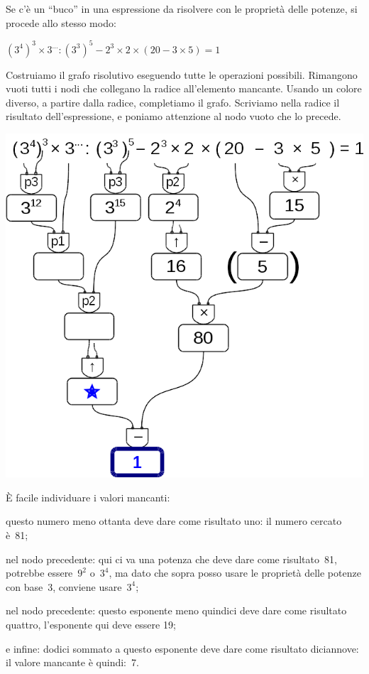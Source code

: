  \begin{esempio}
  Se c'è un ``buco'' in una espressione da risolvere con le proprietà delle 
  potenze, si procede allo stesso modo:
  
  \((3^4)^3 \times 3^{\dots} : (3^3)^5 -2^3 \times 2 \times 
  (20 -3 \times 5) = 1\)
 
  Costruiamo il grafo risolutivo eseguendo tutte le operazioni possibili. 
  Rimangono vuoti tutti i nodi che collegano la radice all'elemento
  mancante. Usando un colore diverso, a partire dalla radice, completiamo
  il grafo. Scriviamo nella radice il risultato dell'espressione, e poniamo 
  attenzione 
  al nodo vuoto che lo precede.
  
\begin{inaccessibleblock}[]
 \begin{center}
  \includegraphics[scale=0.35]{img/op_buco4.png}
 \end{center}
\end{inaccessibleblock}

È facile individuare i valori mancanti:
  
\begin{itemize*}
 \item questo numero meno ottanta deve dare come risultato uno: il numero 
  cercato è~81; 
 \item nel nodo precedente: qui ci va una potenza che deve dare come 
  risultato~81, potrebbe essere~\(9^2\) o~\(3^4\), ma dato che sopra posso 
usare 
  le proprietà delle potenze con base~3, conviene usare~\(3^4\); 
 \item nel nodo precedente: questo esponente meno quindici deve dare come 
  risultato quattro, l'esponente qui deve essere 19;
 \item e infine: dodici sommato a questo esponente deve dare come risultato 
  diciannove: il valore mancante è quindi:~7.
\end{itemize*}

 \end{esempio}

